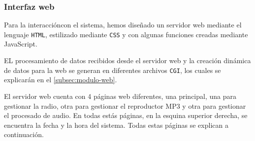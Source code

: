 \subsubsection{Interfaz web}
Para la interaccióncon el sistema, hemos diseñado un servidor web mediante el lenguaje \texttt{HTML}, estilizado mediante \texttt{CSS} y con algunas funciones creadas mediante JavaScript.

EL procesamiento de datos recibidos desde el servidor web y la creación dinámica de datos para la web se generan en diferentes archivos \texttt{CGI}, los cuales se explicarán en el \autoref{subsec:modulo-web}.

El servidor web cuenta con 4 páginas web diferentes, una principal, una para gestionar la radio, otra para gestionar el reproductor MP3 y otra para gestionar el procesado de audio. En todas estás páginas, en la esquina superior derecha, se encuentra la fecha y la hora del sistema. Todas estas páginas se explican a continuación.